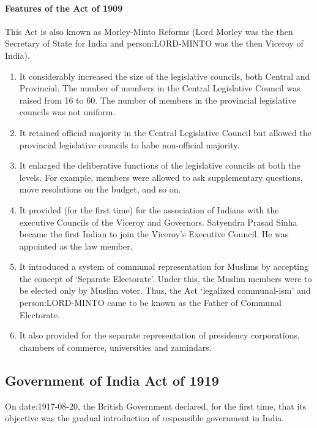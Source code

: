\paragraph{Features of the Act of 1909}
This Act is also known as Morley-Minto Reforms (Lord Morley was the then Secretary of State for India and \gls{person:LORD-MINTO} was the then Viceroy of India).
\begin{enumerate}
  \item It considerably increased the size of the legislative councils, both Central and Provincial. The number of members in the Central Legislative Council was raised from 16 to 60. The number of members in the provincial legislative councils was not uniform.
  \item It retained official majority in the Central Legislative Council but allowed the provincial legislative councils to habe non-official majority.
  \item It enlarged the deliberative functions of the legislative councils at both the levels. For example, members were allowed to ask supplementary questions, move resolutions on the budget, and so on.
  \item It provided (for the first time) for the association of Indians with the executive Councils of the Viceroy and Governors. Satyendra Prasad Sinha became the first Indian to join the Viceroy's Executive Council. He was appointed as the law member.
  \item It introduced a system of communal representation for Muslims by accepting the concept of `Separate Electorate'. Under this, the Muslim members were to be elected only by Muslim voter. Thus, the Act `legalized communal-ism' and \gls{person:LORD-MINTO} came to be known as the Father of Communal Electorate.
  \item It also provided for the separate representation of presidency corporations, chambers of commerce, universities and zamindars.
\end{enumerate}

\subsection{Government of India Act of 1919}

On \gls{date:1917-08-20}, the British Government declared, for the first time, that its objective was the gradual introduction of responsible government in India.

